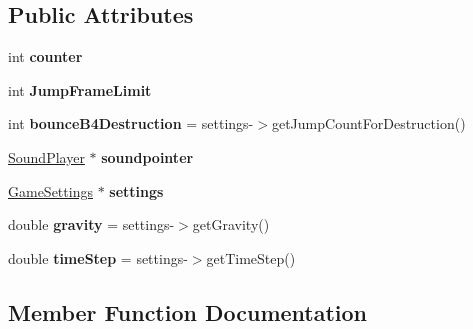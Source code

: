 \subsection*{Public Attributes}
\begin{DoxyCompactItemize}
\item 
int {\bfseries counter}\hypertarget{class_physics_calc_a9ca4a472be8ea235f506a2ef6d9de067}{}\label{class_physics_calc_a9ca4a472be8ea235f506a2ef6d9de067}

\item 
int {\bfseries Jump\+Frame\+Limit}\hypertarget{class_physics_calc_a72b7108e3e2f8cd8fb709849dbb2506c}{}\label{class_physics_calc_a72b7108e3e2f8cd8fb709849dbb2506c}

\item 
int {\bfseries bounce\+B4\+Destruction} = settings-\/$>$get\+Jump\+Count\+For\+Destruction()\hypertarget{class_physics_calc_a774c280f0c153e3a879d51f10091800a}{}\label{class_physics_calc_a774c280f0c153e3a879d51f10091800a}

\item 
\hyperlink{class_sound_player}{Sound\+Player} $\ast$ {\bfseries soundpointer}\hypertarget{class_physics_calc_aa292db7cbe605b0b7cb95a0548afcd29}{}\label{class_physics_calc_aa292db7cbe605b0b7cb95a0548afcd29}

\item 
\hyperlink{class_game_settings}{Game\+Settings} $\ast$ {\bfseries settings}\hypertarget{class_physics_calc_ace492cdc5b24e04044d0ed249917d93e}{}\label{class_physics_calc_ace492cdc5b24e04044d0ed249917d93e}

\item 
double {\bfseries gravity} = settings-\/$>$get\+Gravity()\hypertarget{class_physics_calc_ab941acb0b7803cb4dd1bc60fd3381043}{}\label{class_physics_calc_ab941acb0b7803cb4dd1bc60fd3381043}

\item 
double {\bfseries time\+Step} = settings-\/$>$get\+Time\+Step()\hypertarget{class_physics_calc_aeb23b46816202fed3cab9aa0d852f6a9}{}\label{class_physics_calc_aeb23b46816202fed3cab9aa0d852f6a9}

\end{DoxyCompactItemize}


\subsection{Member Function Documentation}
